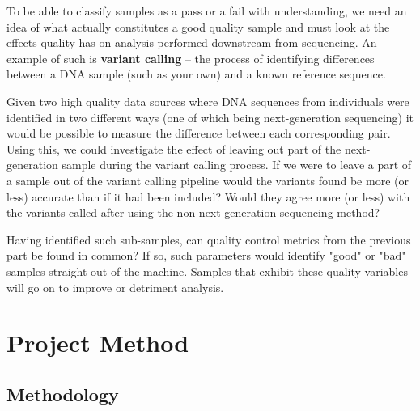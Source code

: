 To be able to classify samples as a pass or a fail with understanding, we need
an idea of what actually constitutes a good quality sample and must look
at the effects quality has on analysis performed downstream from sequencing.
An example of such is \textbf{variant calling} -- the process of identifying
differences between a DNA sample (such as your own) and a known reference
sequence.

Given two high quality data sources where DNA sequences from individuals were
identified in two different ways (one of which being next-generation sequencing)
it would be possible to measure the difference between each corresponding pair.
Using this, we could investigate the effect of leaving out part of the
next-generation sample during the variant calling process.
If we were to leave a part of a sample out of the variant calling
pipeline would the variants found be more (or less) accurate than if it had been
included? Would they agree more (or less) with the variants called after using
the non next-generation sequencing method?

Having identified such sub-samples, can quality control metrics from the
previous part be found in common? If so, such parameters would identify "good"
or "bad" samples straight out of the machine. Samples that exhibit these quality
variables will go on to improve or detriment analysis.


\section{Project Method}
\subsection{Methodology}
\label{chap:methodology}

